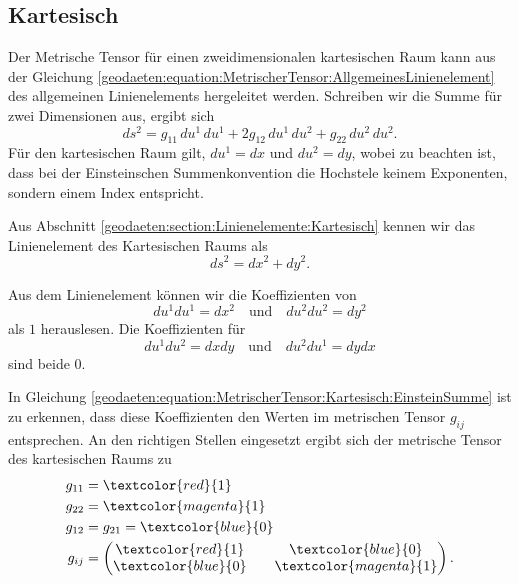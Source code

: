%
%
%
%
\subsection{Kartesisch\label{geodaeten:section:MetrischerTensor:Kartesisch}}

Der Metrische Tensor für einen zweidimensionalen kartesischen Raum kann aus der Gleichung \eqref{geodaeten:equation:MetrischerTensor:AllgemeinesLinienelement} des allgemeinen Linienelements hergeleitet werden.
Schreiben wir die Summe für zwei Dimensionen aus, ergibt sich
\begin{equation}
	ds^2 = g_{11} \, du^1 \, du^1 + 2g_{12} \, du^1 \, du^2 + g_{22} \, du^2 \, du^2.
	\label{geodaeten:equation:MetrischerTensor:Kartesisch:EinsteinSumme}
\end{equation}
Für den kartesischen Raum gilt, $du^1 = dx$ und $du^2 = dy$, wobei zu beachten ist, dass bei der Einsteinschen Summenkonvention die Hochstele keinem Exponenten, sondern einem Index entspricht.

Aus Abschnitt \ref{geodaeten:section:Linienelemente:Kartesisch} kennen wir das Linienelement des Kartesischen Raums als
\begin{equation}
	ds^2 = dx^2 + dy^2 .
\end{equation}

Aus dem Linienelement können wir die Koeffizienten von 
\begin{equation}
	du^1 du^1 = dx^2 \quad \text{und} \quad du^2  du^2 = dy^2 
\end{equation}
als $1$ herauslesen. 
Die Koeffizienten für
\begin{equation}
du^1  du^2 = dx  dy \quad \text{und} \quad du^2  du^1 = dy  dx
\end{equation}
sind beide $0$.

In Gleichung \eqref{geodaeten:equation:MetrischerTensor:Kartesisch:EinsteinSumme} ist zu erkennen, dass diese Koeffizienten den Werten im metrischen Tensor $g_{ij}$ entsprechen.
An den richtigen Stellen eingesetzt ergibt sich der metrische Tensor des kartesischen Raums zu
\begin{equation}
	\begin{aligned}
		g_{11} &= \textcolor{red}{1} \\
		g_{22} &= \textcolor{magenta}{1} \\
		g_{12} &= g_{21} = \textcolor{blue}{0} \\
		g_{ij} &= \begin{pmatrix} \textcolor{red}{1} && \textcolor{blue}{0} \\ \textcolor{blue}{0} && \textcolor{magenta}{1} \end{pmatrix} .
	\end{aligned}
\end{equation}
